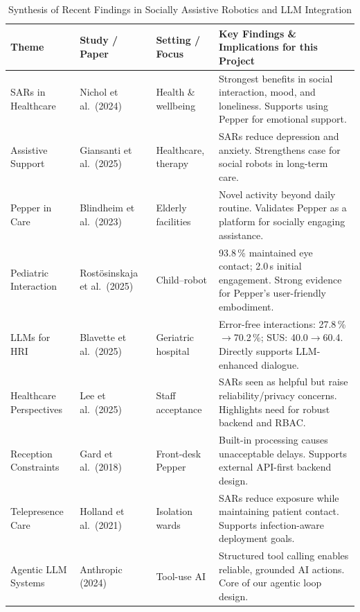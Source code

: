 \documentclass[conference]{IEEEtran}
\begin{document}
\begin{table}[t]
\caption{Synthesis of Recent Findings in Socially Assistive Robotics and LLM Integration}
\label{tab:litreview}
\centering
\renewcommand{\arraystretch}{1.15}
\begin{tabular}{p{2.4cm}p{3.5cm}p{2.8cm}p{8.0cm}}
\toprule
\textbf{Theme} & \textbf{Study / Paper} & \textbf{Setting / Focus} & \textbf{Key Findings \& Implications for this Project} \\
\midrule
SARs in Healthcare      & Nichol et al.\ (2024)~\cite{nichol2024}          & Health \& wellbeing       & Strongest benefits in social interaction, mood, and loneliness. Supports using Pepper for emotional support. \\
Assistive Support       & Giansanti et al.\ (2025)~\cite{giansanti2025}    & Healthcare, therapy       & SARs reduce depression and anxiety. Strengthens case for social robots in long-term care. \\
Pepper in Care          & Blindheim et al.\ (2023)~\cite{blindheim2023}    & Elderly facilities        & Novel activity beyond daily routine. Validates Pepper as a platform for socially engaging assistance. \\
Pediatric Interaction   & Rost\"{o}sinskaja et al.\ (2025)~\cite{rostosinskaja2025} & Child--robot    & 93.8\,\% maintained eye contact; 2.0\,s initial engagement. Strong evidence for Pepper's user-friendly embodiment. \\
LLMs for HRI            & Blavette et al.\ (2025)~\cite{blavette2025}      & Geriatric hospital        & Error-free interactions: 27.8\,\%$\to$70.2\,\%; SUS: 40.0$\to$60.4. Directly supports LLM-enhanced dialogue. \\
Healthcare Perspectives & Lee et al.\ (2025)~\cite{lee2025}                & Staff acceptance          & SARs seen as helpful but raise reliability/privacy concerns. Highlights need for robust backend and RBAC. \\
Reception Constraints   & Gard et al.\ (2018)~\cite{gard2018}              & Front-desk Pepper         & Built-in processing causes unacceptable delays. Supports external API-first backend design. \\
Telepresence Care       & Holland et al.\ (2021)~\cite{holland2021}        & Isolation wards           & SARs reduce exposure while maintaining patient contact. Supports infection-aware deployment goals. \\
Agentic LLM Systems     & Anthropic (2024)~\cite{anthropic2024}            & Tool-use AI               & Structured tool calling enables reliable, grounded AI actions. Core of our agentic loop design. \\
\bottomrule
\end{tabular}
\end{table}
\end{document}
